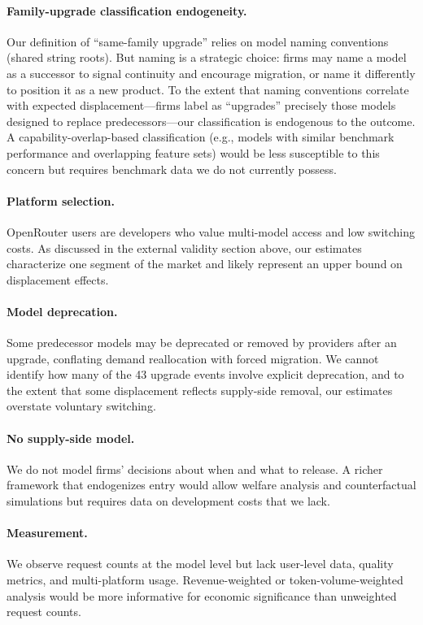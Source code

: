 \documentclass[11pt, a4paper]{article}
\begin{document}
\paragraph{Family-upgrade classification endogeneity.} Our definition of ``same-family upgrade'' relies on model naming conventions (shared string roots). But naming is a strategic choice: firms may name a model as a successor to signal continuity and encourage migration, or name it differently to position it as a new product. To the extent that naming conventions correlate with expected displacement---firms label as ``upgrades'' precisely those models designed to replace predecessors---our classification is endogenous to the outcome. A capability-overlap-based classification (e.g., models with similar benchmark performance and overlapping feature sets) would be less susceptible to this concern but requires benchmark data we do not currently possess.

\paragraph{Platform selection.} OpenRouter users are developers who value multi-model access and low switching costs. As discussed in the external validity section above, our estimates characterize one segment of the market and likely represent an upper bound on displacement effects.

\paragraph{Model deprecation.} Some predecessor models may be deprecated or removed by providers after an upgrade, conflating demand reallocation with forced migration. We cannot identify how many of the 43 upgrade events involve explicit deprecation, and to the extent that some displacement reflects supply-side removal, our estimates overstate voluntary switching.

\paragraph{No supply-side model.} We do not model firms' decisions about when and what to release. A richer framework that endogenizes entry would allow welfare analysis and counterfactual simulations but requires data on development costs that we lack.

\paragraph{Measurement.} We observe request counts at the model level but lack user-level data, quality metrics, and multi-platform usage. Revenue-weighted or token-volume-weighted analysis would be more informative for economic significance than unweighted request counts.
\end{document}
